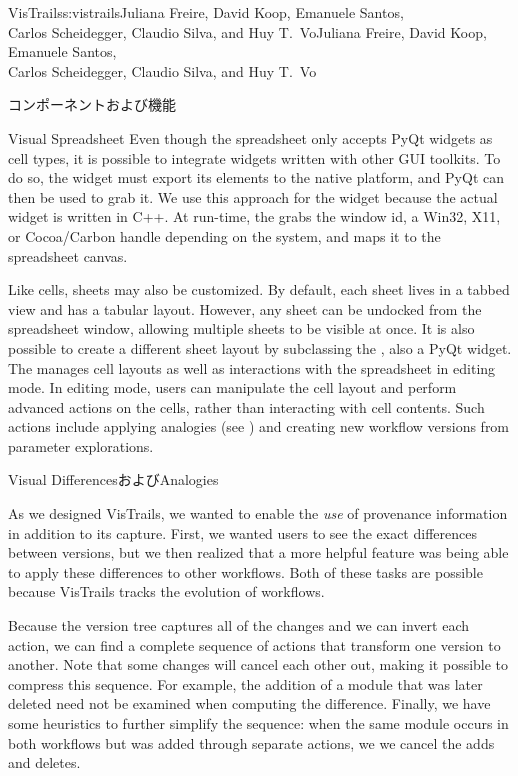 \begin{aosachaptertoc}{VisTrails}{s:vistrails}{Juliana Freire, David Koop, Emanuele Santos, \\ Carlos Scheidegger, Claudio Silva, and Huy T.\ Vo}{Juliana Freire, David Koop, Emanuele Santos, \\ \hspace*{0.9cm} Carlos Scheidegger, Claudio Silva, and Huy T.\ Vo}
\begin{aosasect1}{コンポーネントおよび機能}
\begin{aosasect2}{Visual Spreadsheet}
Even though the spreadsheet only accepts PyQt widgets as cell types,
it is possible to integrate widgets written with other GUI toolkits.
To do so, the widget must export its elements to the native platform,
and PyQt can then be used to grab it. We use this approach for the
 widget because the actual widget is written in C++. At
run-time, the  grabs the window id, a Win32, X11, or
Cocoa/Carbon handle depending on the system, and maps it to the
spreadsheet canvas.

Like cells, sheets may also be customized. By default, each sheet
lives in a tabbed view and has a tabular layout.  However, any sheet
can be undocked from the spreadsheet window, allowing multiple sheets
to be visible at once.  It is also possible to create a different
sheet layout by subclassing the , also a
PyQt widget. The  manages cell layouts as
well as interactions with the spreadsheet in editing mode. In editing
mode, users can manipulate the cell layout and perform advanced
actions on the cells, rather than interacting with cell contents.  Such
actions include applying analogies (see
) and creating new workflow versions
from parameter explorations.

\end{aosasect2}

\begin{aosasect2}{Visual DifferencesおよびAnalogies}
\label{sec.vistrails.diff}

As we designed VisTrails, we wanted to enable the \emph{use} of
provenance information in addition to its capture.  First, we wanted
users to see the exact differences between versions, but we then realized that
a more helpful feature was being able to apply these differences to other
workflows.  Both of these tasks are possible because VisTrails tracks
the evolution of workflows.

Because the version tree captures all of the changes and we can invert
each action, we can find a complete sequence of actions that transform one
version to another.  Note that some changes will cancel each other
out, making it possible to compress this sequence. For example, the
addition of a module that was later deleted need not be examined when
computing the difference.  Finally, we have some heuristics to further
simplify the sequence: when the same module occurs in both workflows
but was added through separate actions, we we cancel the adds and
deletes.


\end{aosasect2}
\end{aosasect1}
\end{aosachaptertoc}
